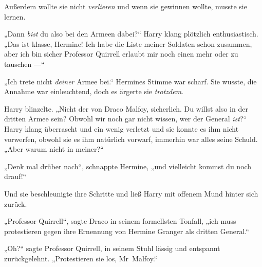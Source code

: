 Außerdem wollte sie nicht \emph{verlieren} und wenn sie gewinnen wollte, musste sie lernen.

„Dann \emph{bist} du also bei den Armeen dabei?“ Harry klang plötzlich enthusiastisch.
„Das ist klasse, Hermine! Ich habe die Liste meiner Soldaten schon zusammen, aber ich bin sicher Professor Quirrell erlaubt mir noch einen mehr oder zu tauschen —“

„Ich trete nicht \emph{deiner} Armee bei.“ Hermines Stimme war scharf. Sie wusste, die Annahme war einleuchtend, doch es ärgerte sie \emph{trotzdem}.

Harry blinzelte.
„Nicht der von Draco Malfoy, sicherlich. Du willst also in der dritten Armee sein? Obwohl wir noch gar nicht wissen, wer der General \emph{ist}?“ Harry klang überrascht und ein wenig verletzt und sie konnte es ihm nicht vorwerfen, obwohl sie es ihm natürlich vorwarf, immerhin war alles seine Schuld.
„Aber warum nicht in meiner?“

„Denk mal drüber nach“, schnappte Hermine, „und vielleicht kommst du noch drauf!“

Und sie beschleunigte ihre Schritte und ließ Harry mit offenem Mund hinter sich zurück.

\later

„Professor Quirrell“, sagte Draco in seinem formellsten Tonfall, „ich muss protestieren gegen ihre Ernennung von Hermine Granger als dritten General.“

„Oh?“ sagte Professor Quirrell, in seinem Stuhl lässig und entspannt zurückgelehnt.
„Protestieren sie los, Mr~Malfoy.“

